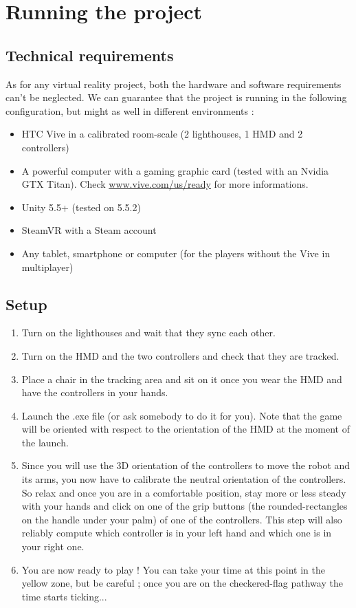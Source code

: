 \documentclass[12pt]{article}
\begin{document}
\section{Running the project}

\subsection{Technical requirements}

As for any virtual reality project, both the hardware and software requirements can't be neglected. We can guarantee that the project is running in the following configuration, but might as well in different environments :

\begin{itemize}
	\item HTC Vive in a calibrated room-scale (2 lighthouses, 1 HMD and 2 controllers)
	\item A powerful computer with a gaming graphic card (tested with an Nvidia GTX Titan). Check \href{https://www.vive.com/us/ready/}{www.vive.com/us/ready} for more informations.
	\item Unity 5.5+ (tested on 5.5.2)
	\item SteamVR with a Steam account
	\item Any tablet, smartphone or computer (for the players without the Vive in multiplayer)
\end{itemize}

\subsection{Setup}

\begin{enumerate}
	\item Turn on the lighthouses and wait that they sync each other.
	\item Turn on the HMD and the two controllers and check that they are tracked.
	\item Place a chair in the tracking area and sit on it once you wear the HMD and have the controllers in your hands.
	\item Launch the .exe file (or ask somebody to do it for you). Note that the game will be oriented with respect to the orientation of the HMD at the moment of the launch.
	\item Since you will use the 3D orientation of the controllers to move the robot and its arms, you now have to calibrate the neutral orientation of the controllers. So relax and once you are in a comfortable position, stay more or less steady with your hands and click on one of the grip buttons (the rounded-rectangles on the handle under your palm) of one of the controllers. This step will also reliably compute which controller is in your left hand and which one is in your right one.
	\item You are now ready to play ! You can take your time at this point in the yellow zone, but be careful ; once you are on the checkered-flag pathway the time starts ticking...
\end{enumerate}
\end{document}
